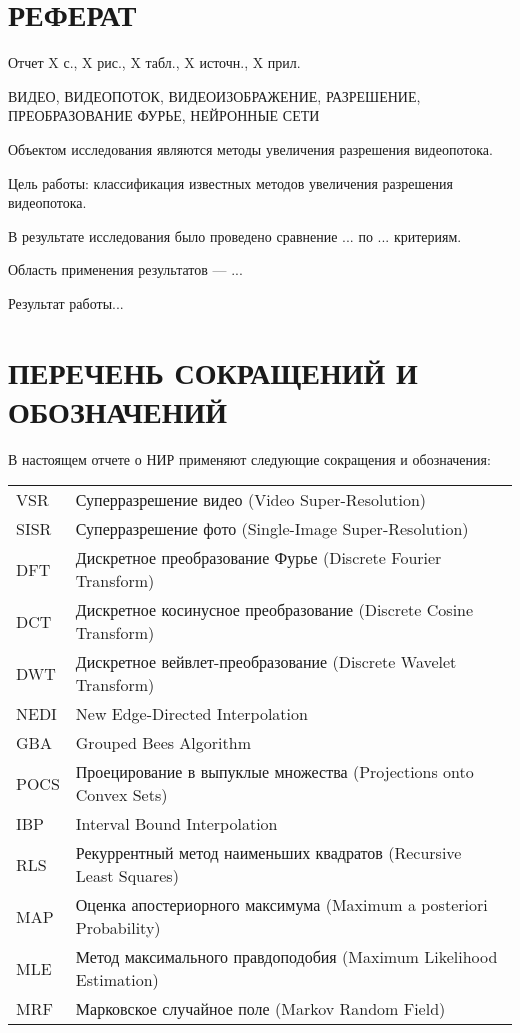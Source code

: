 \documentclass{bmstu}
\begin{document}


\setcounter{page}{3}

{\centering \chapter*{РЕФЕРАТ}}

Отчет X с., X рис., X табл., X источн., X прил.

\noindent ВИДЕО, ВИДЕОПОТОК, ВИДЕОИЗОБРАЖЕНИЕ, РАЗРЕШЕНИЕ, ПРЕОБРАЗОВАНИЕ ФУРЬЕ, НЕЙРОННЫЕ СЕТИ

Объектом исследования являются методы увеличения разрешения видеопотока.

Цель работы: классификация известных методов увеличения разрешения видеопотока.

В результате исследования было проведено сравнение ... по ... критериям.

Область применения результатов --- ...

Результат работы...

\maketableofcontents

{\centering \chapter*{ПЕРЕЧЕНЬ СОКРАЩЕНИЙ И ОБОЗНАЧЕНИЙ}}

В настоящем отчете о НИР применяют следующие сокращения и обозначения:

\begin{table}[H]
\begin{tabular}{p{3cm}p{13.5cm}}
VSR & Суперразрешение видео (Video Super-Resolution)
\tabularnewline
SISR & Суперразрешение фото (Single-Image Super-Resolution)
\tabularnewline
DFT & Дискретное преобразование Фурье (Discrete Fourier Transform)
\tabularnewline
DCT & Дискретное косинусное преобразование (Discrete Cosine Transform)
\tabularnewline
DWT & Дискретное вейвлет-преобразование (Discrete Wavelet Transform)
\tabularnewline
NEDI & New Edge-Directed Interpolation
\tabularnewline
GBA & Grouped Bees Algorithm
\tabularnewline
POCS & Проецирование в выпуклые множества (Projections onto Convex Sets)
\tabularnewline
IBP & Interval Bound Interpolation
\tabularnewline
RLS & Рекуррентный метод наименьших квадратов (Recursive Least Squares)
\tabularnewline
MAP & Оценка апостериорного максимума (Maximum a posteriori Probability)
\tabularnewline
MLE & Метод максимального правдоподобия (Maximum Likelihood Estimation)
\tabularnewline
MRF & Марковское случайное поле (Markov Random Field)
\tabularnewline
\end{tabular}
\end{table}
\end{document}
